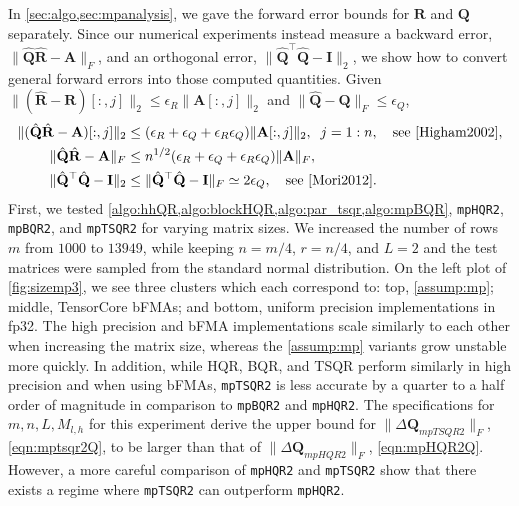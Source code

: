 \documentclass[review,onefignum,onetabnum]{siamart190516}
\newcommand{\bb}[1]{\mathbf{#1}}
\begin{document}
In \cref{sec:algo,sec:mpanalysis}, we gave the forward error bounds for $\bb{R}$ and $\bb{Q}$ separately. 
Since our numerical experiments instead measure a backward error, $\|\hat{\bb{Q}}\hat{\bb{R}}-\bb{A}\|_F$, and an orthogonal error, $\|\hat{\bb{Q}}^{\top}\hat{\bb{Q}}-\bb{I}\|_2$, we show how to convert general forward errors into those computed quantities.
Given $\|(\hat{\bb{R}}-\bb{R})[:,j]\|_2\leq \epsilon_R \|\bb{A}[:,j]\|_2$ and $\|\hat{\bb{Q}}-\bb{Q}\|_F\leq \epsilon_Q$,
\begin{align}
	\|(\hat{\bb{Q}}\hat{\bb{R}}-\bb{A})[:,j]\|_2 &\leq (\epsilon_R+\epsilon_Q + \epsilon_R\epsilon_Q)\|\bb{A}[:,j]\|_2,\;\; j=1:n,\quad \text{see \cite{Higham2002}},\\
	\|\hat{\bb{Q}}\hat{\bb{R}}-\bb{A}\|_F &\leq n^{1/2}(\epsilon_R+\epsilon_Q + \epsilon_R\epsilon_Q)\|\bb{A}\|_F, \label{eqn:QRA} \\
	\|\hat{\bb{Q}}^{\top}\hat{\bb{Q}}-\bb{I}\|_2 &\leq \|\hat{\bb{Q}}^{\top}\hat{\bb{Q}}-\bb{I}\|_F \simeq 2\epsilon_Q,\quad\text{see \cite{Mori2012}} \label{eqn:QQI}.
\end{align}
First, we tested \cref{algo:hhQR,algo:blockHQR,algo:par_tsqr,algo:mpBQR}, {\tt mpHQR2}, {\tt mpBQR2}, and {\tt mpTSQR2} for varying matrix sizes.
We increased the number of rows $m$ from $1000$ to $13949$, while keeping $n=m/4$, $r=n/4$, and $L=2$ and the test matrices were sampled from the standard normal distribution. 
On the left plot of \cref{fig:sizemp3}, we see three clusters which each correspond to: top, \cref{assump:mp}; middle, TensorCore bFMAs; and bottom, uniform precision implementations in fp32.
The high precision and bFMA implementations scale similarly to each other when increasing the matrix size, whereas the \cref{assump:mp} variants grow unstable more quickly.
In addition, while HQR, BQR, and TSQR perform similarly in high precision and when using bFMAs, {\tt mpTSQR2} is less accurate by a quarter to a half order of magnitude in comparison to {\tt mpBQR2} and {\tt mpHQR2}.
The specifications for $m,n,L,M_{l,h}$ for this experiment derive the upper bound for $\|\Delta \bb{Q}_{mpTSQR2}\|_F$, \cref{eqn:mptsqr2Q}, to be larger than that of $\|\Delta \bb{Q}_{mpHQR2}\|_F$, \cref{eqn:mpHQR2Q}.
However, a more careful comparison of {\tt mpHQR2} and {\tt mpTSQR2} show that there exists a regime where {\tt mpTSQR2} can outperform {\tt mpHQR2}.
\end{document}
